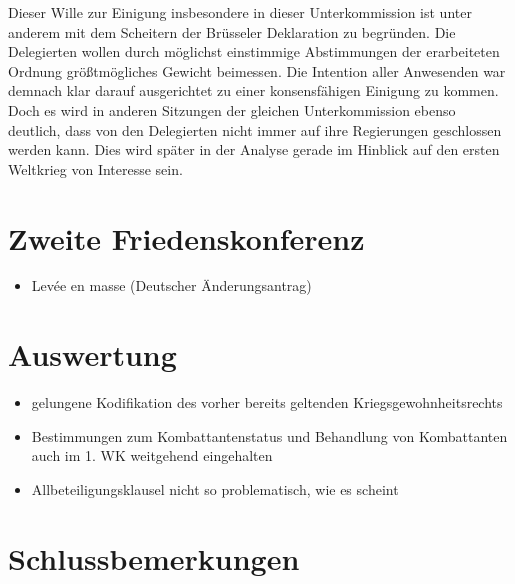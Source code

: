 \documentclass[12pt]{scrartcl}
\begin{document}
Dieser Wille zur Einigung insbesondere in dieser Unterkommission ist unter anderem mit dem Scheitern der Brüsseler Deklaration zu begründen. Die Delegierten wollen durch möglichst einstimmige Abstimmungen der erarbeiteten Ordnung größtmögliches Gewicht beimessen. Die Intention aller Anwesenden war demnach klar darauf ausgerichtet zu einer konsensfähigen Einigung zu kommen. Doch es wird in anderen Sitzungen der gleichen Unterkommission ebenso deutlich, dass von den Delegierten nicht immer auf ihre Regierungen geschlossen werden kann. Dies wird später in der Analyse gerade im Hinblick auf den ersten Weltkrieg von Interesse sein.

\section{Zweite Friedenskonferenz}
\begin{itemize}
	\item Levée en masse (Deutscher Änderungsantrag)
\end{itemize}
\section{Auswertung}
\begin{itemize}
	\item gelungene Kodifikation des vorher bereits geltenden Kriegsgewohnheitsrechts
	\item Bestimmungen zum Kombattantenstatus und Behandlung von Kombattanten auch im 1. WK weitgehend eingehalten
	\item Allbeteiligungsklausel nicht so problematisch, wie es scheint
\end{itemize}
\cite{Gasser1991}
\cite{Lingen2014}
\cite{Fraenkel1968}
\cite{Heffter1951}
\cite{DeutschesReich2010}
\cite{Scott1921}



\section{Schlussbemerkungen}


\newpage

\printbibliography
{}


\newpage
{}
\end{document}
